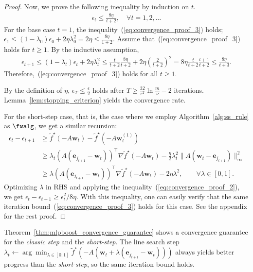 \begin{proof}
    Now, we prove the following inequality by induction on $t$.
    \begin{align}
        \label{eq:convergence_proof_3}
        \epsilon_t \leq \frac{8 \eta}{t + 2}, 
        \quad \forall t = 1, 2, \dots
    \end{align}
    For the base case $t = 1$, 
    the inequality~(\ref{eq:convergence_proof_3}) holds; 
    $
        \epsilon_1
        \leq (1 - \lambda_0) \epsilon_0 + 2 \eta \lambda_0^2
        = 2 \eta
        \leq \frac{8\eta}{1 + 2}
    $. Assume that~(\ref{eq:convergence_proof_3}) holds for $t \geq 1$. 
    By the inductive assumption,
    \begin{align*}
        \epsilon_{t+1}
            \leq (1 - \lambda_t) \epsilon_t + 2 \eta \lambda_t^2 
            \leq \frac{t}{t + 2} \frac{8 \eta}{t + 2} 
                + 2 \eta \left( \frac{2}{t + 2} \right)^2 
            = 8 \eta \frac{t}{t + 2} \frac{t + 1}{t + 2}
            \leq \frac{8 \eta}{t + 3}.
    \end{align*}
    Therefore,~(\ref{eq:convergence_proof_3}) holds 
    for all $t \geq 1$.

    By the definition of $\eta$, 
    $\epsilon_T \leq \frac{\epsilon}{2}$ holds 
    after $T \geq \frac{32}{\epsilon^2} \ln \frac{m}{\nu} - 2$ 
    iterations. Lemma~\ref{lem:stopping_criterion} yields 
    the convergence rate. 

    For the short-step case, 
    that is, the case where we employ Algorithm~\ref{alg:ss_rule} as $\fwalg$, 
    we get a similar recursion:
    \begin{align}
        \epsilon_t - \epsilon_{t+1}
            & \geq \tilde{f}^\star ( -A \bm{w}_t )
                - \tilde{f}^\star ( -A \bm{w}_t^{(1)} ) \nonumber \\
            \label{eq:convergence_proof_4}
            & \geq \lambda_t ( A (\bm{e}_{j_{t+1}} - \bm{w}_{t}) )^\top
                \nabla \tilde{f}^\star (- A \bm{w}_t)
                - \frac{\eta}{2} \lambda_t^2
                \| A(\bm{w}_t - \bm{e}_{j_{t+1}}) \|_\infty^2 \\
            & \geq \lambda ( A (\bm{e}_{j_{t+1}} - \bm{w}_{t}) )^\top
                \nabla \tilde{f}^\star (- A \bm{w}_t)
                - 2\eta \lambda^2,
                \quad \quad
                \forall \lambda \in [0, 1].
                \nonumber
    \end{align}
    Optimizing $\lambda$ in RHS 
    and applying the inequality~(\ref{eq:convergence_proof_2}), 
    we get $\epsilon_t - \epsilon_{t+1} \geq \epsilon_t^2 / 8\eta$. 
    With this inequality, one can easily verify that 
    the same iteration bound~(\ref{eq:convergence_proof_3}) holds 
    for this case. 
    See the appendix for the rest proof. 
\end{proof}
Theorem~\ref{thm:mlpboost_convergence_guarantee} shows 
a convergence guarantee 
for the \emph{classic step} and the \emph{short-step}. 
The line search step 
$
    \lambda_{t} \gets \arg \min_{\lambda \in [0, 1]}
    \tilde{f}^\star \left(
        -A (\bm{w}_t + \lambda (\bm{e}_{j_{t+1}} - \bm{w}_t))
    \right)
$ always yields better progress than the \emph{short-step}, 
so the same iteration bound holds. 


